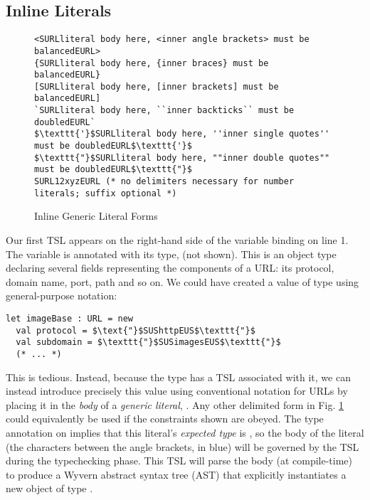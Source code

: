 \subsection{Inline Literals}
\begin{figure}[t]
\begin{lstlisting}
<SURLliteral body here, <inner angle brackets> must be balancedEURL>
{SURLliteral body here, {inner braces} must be balancedEURL}
[SURLliteral body here, [inner brackets] must be balancedEURL]
`SURLliteral body here, ``inner backticks`` must be doubledEURL`
$\texttt{'}$SURLliteral body here, ''inner single quotes'' must be doubledEURL$\texttt{'}$
$\texttt{"}$SURLliteral body here, ""inner double quotes"" must be doubledEURL$\texttt{"}$
SURL12xyzEURL (* no delimiters necessary for number literals; suffix optional *)
\end{lstlisting}
\vspace{-8px}
\caption{Inline Generic Literal Forms}
\vspace{-10px}
\label{f-delims}
\end{figure}
Our first TSL appears on the right-hand side of the variable binding on line 1. The variable  is annotated with its type,  (not shown). This is an {object type} declaring several fields representing the components of a URL: its protocol, domain name, port, path and so on. We could have created a value of type  using general-purpose notation:
\begin{lstlisting}
let imageBase : URL = new
  val protocol = $\text{"}$SUShttpEUS$\texttt{"}$
  val subdomain = $\texttt{"}$SUSimagesEUS$\texttt{"}$
  (* ... *)
\end{lstlisting}
This is tedious. Instead, because the  type has a TSL associated with it, we can instead introduce precisely this value using conventional notation for URLs by placing it in the \emph{body} of a \emph{generic literal}, . Any other delimited form in Fig. \ref{f-delims} could equivalently be used if the constraints shown are obeyed. The type annotation on  implies that this literal's \emph{expected type} is , so the {body} of the literal (the characters between the angle brackets, in blue) will be governed by the  TSL during the typechecking phase. This TSL will parse the body ({at compile-time}) to produce a Wyvern abstract syntax tree (AST) that explicitly instantiates a new object of type . 

